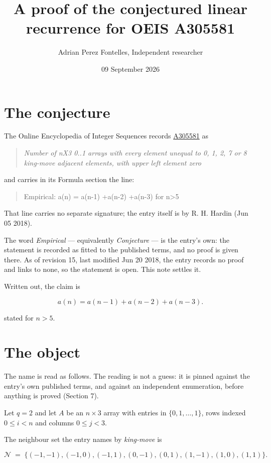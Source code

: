 \documentclass[11pt]{article}
\title{A proof of the conjectured linear recurrence for OEIS A305581}
\author{Adrian Perez Fontelles, Independent researcher}
\date{09 September 2026}
\theoremstyle{definition}
\begin{document}
\maketitle
\section{The conjecture}

The Online Encyclopedia of Integer Sequences records \href{https://oeis.org/A305581}{A305581} as

\begin{quote}\itshape Number of nX3 0..1 arrays with every element unequal to 0, 1, 2, 7 or 8 king-move adjacent elements, with upper left element zero\end{quote}

and carries in its Formula section the line:

\begin{quote}\ttfamily Empirical: a(n) = a(n-1) +a(n-2) +a(n-3) for n>5\end{quote}

That line carries no separate signature; the entry itself is by R. H. Hardin (Jun 05 2018).

The word {\itshape Empirical} --- equivalently {\itshape Conjecture} --- is the entry's own: the statement is recorded as fitted to the published terms, and no proof is given there. As of revision 15, last modified Jun 20 2018, the entry records no proof and links to none, so the statement is open. This note settles it.

Written out, the claim is

\[a(n) = a(n-1) + a(n-2) + a(n-3).\]

stated for $n > 5$.

\section{The object}

The name is read as follows. The reading is not a guess: it is pinned against the entry's own published terms, and against an independent enumeration, before anything is proved (Section 7).

Let $q = 2$ and let $A$ be an $n \times 3$ array with entries in $\{0,1,\dots,1\}$, rows indexed $0 \le i < n$ and columns $0 \le j < 3$.

The neighbour set the entry names by {\itshape king-move} is

\[\mathcal{N} \;=\; \{(-1,-1), (-1,0), (-1,1), (0,-1), (0,1), (1,-1), (1,0), (1,1)\}.\]
\end{document}
